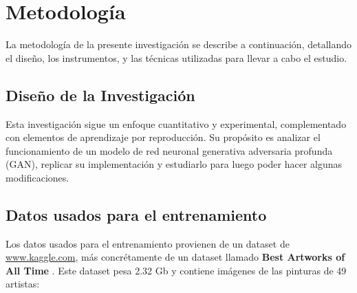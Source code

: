 \documentclass[../main.tex]{subfiles}
\begin{document}
\section{Metodología}
La metodología de la presente investigación se describe a continuación, detallando el diseño, los instrumentos, y las técnicas utilizadas para llevar a cabo el estudio.

\subsection{Diseño de la Investigación}

Esta investigación sigue un enfoque cuantitativo y experimental, complementado con elementos de aprendizaje por reproducción. Su propósito es analizar el funcionamiento de un modelo de red neuronal generativa adversaria profunda (GAN), replicar su implementación y estudiarlo para luego poder hacer algunas modificaciones. 

\subsection{Datos usados para el entrenamiento}\label{sec:dataset_explanation}

Los datos usados para el entrenamiento provienen de un dataset de \url{www.kaggle.com}, más concrétamente de un dataset llamado \textbf{Best Artworks of All Time} \cite{BestArtworksofAllTime2019}. Este dataset pesa 2.32 Gb y contiene imágenes de las pinturas de 49 artistas:
\end{document}
